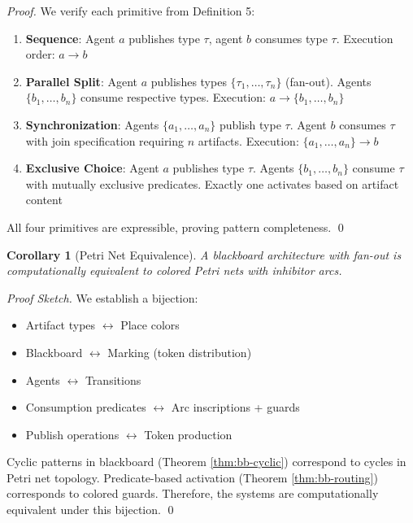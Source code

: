 \documentclass[11pt]{article}
\newtheorem{corollary}[theorem]{Corollary}
\begin{document}
\begin{proof}
We verify each primitive from Definition 5:

\begin{enumerate}
    \item \textbf{Sequence}: Agent $a$ publishes type $\tau$, agent $b$ consumes type $\tau$. Execution order: $a \rightarrow b$ \checkmark

    \item \textbf{Parallel Split}: Agent $a$ publishes types $\{\tau_1, \ldots, \tau_n\}$ (fan-out). Agents $\{b_1, \ldots, b_n\}$ consume respective types. Execution: $a \rightarrow \{b_1, \ldots, b_n\}$ \checkmark

    \item \textbf{Synchronization}: Agents $\{a_1, \ldots, a_n\}$ publish type $\tau$. Agent $b$ consumes $\tau$ with join specification requiring $n$ artifacts. Execution: $\{a_1, \ldots, a_n\} \rightarrow b$ \checkmark

    \item \textbf{Exclusive Choice}: Agent $a$ publishes type $\tau$. Agents $\{b_1, \ldots, b_n\}$ consume $\tau$ with mutually exclusive predicates. Exactly one activates based on artifact content \checkmark
\end{enumerate}

All four primitives are expressible, proving pattern completeness. \qed
\end{proof}

\begin{corollary}[Petri Net Equivalence]
\label{cor:petri}
A blackboard architecture with fan-out is computationally equivalent to colored Petri nets with inhibitor arcs.
\end{corollary}

\begin{proof}[Proof Sketch]
We establish a bijection:
\begin{itemize}
    \item Artifact types $\leftrightarrow$ Place colors
    \item Blackboard $\leftrightarrow$ Marking (token distribution)
    \item Agents $\leftrightarrow$ Transitions
    \item Consumption predicates $\leftrightarrow$ Arc inscriptions + guards
    \item Publish operations $\leftrightarrow$ Token production
\end{itemize}

Cyclic patterns in blackboard (Theorem \ref{thm:bb-cyclic}) correspond to cycles in Petri net topology. Predicate-based activation (Theorem \ref{thm:bb-routing}) corresponds to colored guards. Therefore, the systems are computationally equivalent under this bijection. \qed
\end{proof}
\end{document}
